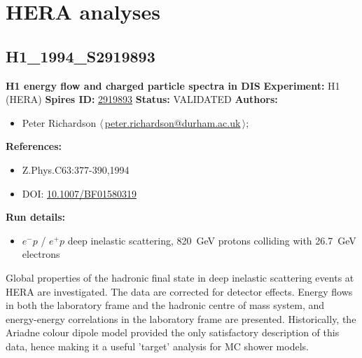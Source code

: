 \clearpage


\section{HERA analyses}
\subsection[H1\_1994\_S2919893]{H1\_1994\_S2919893\,\cite{Abt:1994ye}}
\textbf{H1 energy flow and charged particle spectra in DIS}\newline
\textbf{Experiment:} H1 (HERA) \newline
\textbf{Spires ID:} \href{http://www.slac.stanford.edu/spires/find/hep/www?rawcmd=key+2919893}{2919893}\newline
\textbf{Status:} VALIDATED\newline
\textbf{Authors:}
\begin{itemize}
  \item Peter Richardson $\langle\,$\href{mailto:peter.richardson@durham.ac.uk}{peter.richardson@durham.ac.uk}$\,\rangle$;
\end{itemize}
\textbf{References:}
\begin{itemize}
  \item Z.Phys.C63:377-390,1994
  \item DOI: \href{http://dx.doi.org/10.1007/BF01580319}{10.1007/BF01580319}
\end{itemize}
\textbf{Run details:}
\begin{itemize}

  \item $e^- p$ / $e^+ p$ deep inelastic scattering, 820~GeV protons colliding with 26.7~GeV electrons\end{itemize}

\noindent Global properties of the hadronic final state in deep inelastic scattering events at HERA are investigated. The data are corrected for detector effects. Energy flows in both the laboratory frame and the hadronic centre of mass system, and energy-energy correlations in the laboratory frame are presented.  Historically, the Ariadne colour dipole model provided the only satisfactory description of this data, hence making it a useful 'target' analysis for MC shower models.

\clearpage


\clearpage

